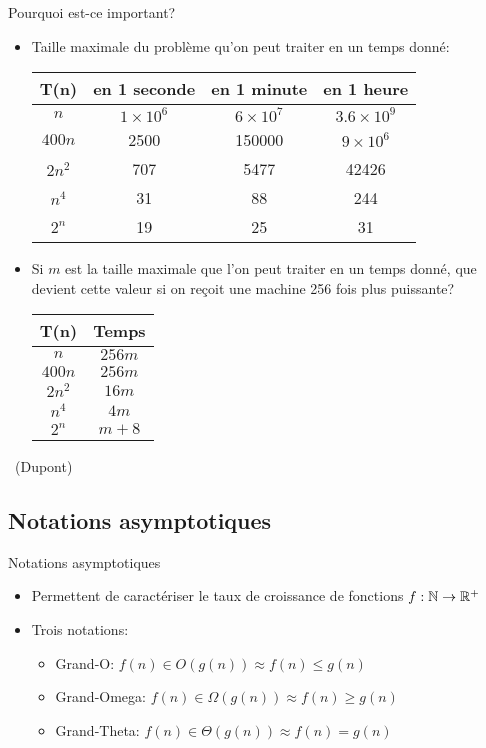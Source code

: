 \begin{frame}{Pourquoi est-ce important?}

\begin{itemize}
\item Taille maximale du problème qu'on peut traiter en un temps donné:
\begin{center}
\footnotesize
\begin{tabular}{cccc}
\hline
T(n) & en 1 seconde & en 1 minute & en 1 heure\\
\hline
$n$ & $1\times 10^6$ & $6\times 10^7$ & $3.6\times 10^9$\\
$400n$ & 2500 & 150000 & $9\times 10^6$\\
$2n^2$ & 707 & 5477 & 42426\\
$n^4$ & 31 & 88 & 244\\
$2^n$ & 19 & 25 & 31\\
\hline
\end{tabular}
\end{center}

\bigskip

\item Si $m$ est la taille maximale que l'on peut traiter en un temps
  donné, que devient cette valeur si on reçoit une machine 256 fois plus puissante?
\begin{center}
\footnotesize
\begin{tabular}{cc}
\hline
T(n) &Temps\\
\hline
$n$ & $256m$\\
$400n$ & $256m$\\
$2n^2$ & $16m$\\
$n^4$ & $4m$\\
$2^n$ & $m+8$\\
\hline
\end{tabular}
\end{center}
\end{itemize}

~\hfill{\scriptsize(Dupont)}

\end{frame}

\subsection{Notations asymptotiques}

\begin{frame}{Notations asymptotiques}
\begin{itemize}
\item Permettent de caractériser le taux de croissance de fonctions $f:\mathbb{N}\rightarrow \mathbb{R}^+$

\bigskip

\item Trois notations:
\begin{itemize}
\item Grand-O: $f(n)\in O(g(n)) \approx f(n)\leq g(n)$
\item Grand-Omega: $f(n)\in \Omega(g(n)) \approx f(n)\geq g(n)$
\item Grand-Theta: $f(n) \in \Theta(g(n)) \approx f(n) = g(n)$
\end{itemize}
\end{itemize}
\end{frame}

